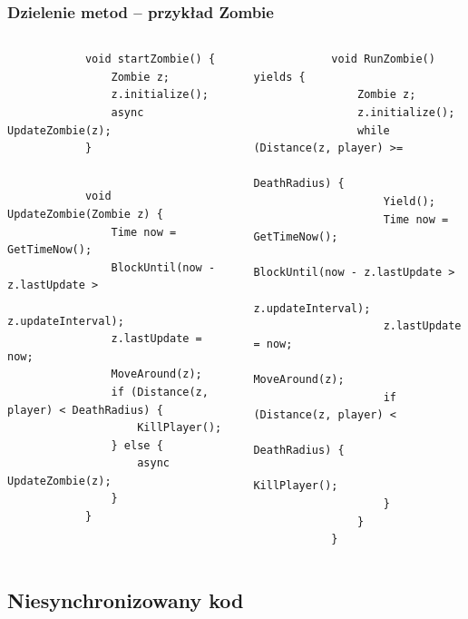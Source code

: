 \documentclass{beamer}
\begin{document}
\begin{frame}[fragile]
\frametitle{Dzielenie metod -- przykład Zombie}
\begin{columns}
	\begin{column}{0.45\paperwidth} 
		{\fontsize{7pt}{8pt}
			\begin{verbatim}
			void startZombie() {
			    Zombie z;
			    z.initialize();
			    async UpdateZombie(z);
			}
			
		\end{verbatim}
		}
		{\fontsize{7pt}{8pt}
		\begin{verbatim}
			void UpdateZombie(Zombie z) {
			    Time now = GetTimeNow();
			    BlockUntil(now - z.lastUpdate >
			            z.updateInterval);
			    z.lastUpdate = now;
			    MoveAround(z);
			    if (Distance(z, player) < DeathRadius) {
			        KillPlayer();
			    } else {
			        async UpdateZombie(z);
			    }
			}
		\end{verbatim}}
	\end{column}  
	\begin{column}{0.45\paperwidth} 
		{\fontsize{7pt}{8pt}\begin{verbatim}
			void RunZombie() yields {
			    Zombie z;
			    z.initialize();
			    while (Distance(z, player) >= 
			           DeathRadius) {
			        Yield();
			        Time now = GetTimeNow();
			        BlockUntil(now - z.lastUpdate > 
			                   z.updateInterval);
			        z.lastUpdate = now;
			        MoveAround(z);
			        if (Distance(z, player) < 
			            DeathRadius) {
			            KillPlayer(); 
			        }
			    }
			}
		\end{verbatim}}
	\end{column}
\end{columns}
\end{frame}

\subsection{Niesynchronizowany kod}
\end{document}
